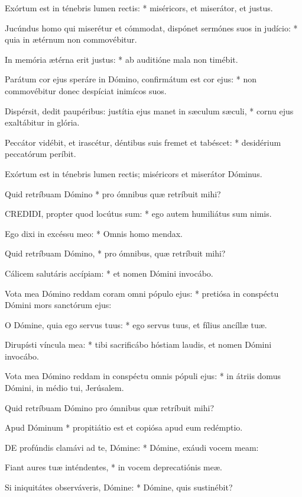 Exórtum est in ténebris lumen rectis: * miséricors, et miserátor, et justus.

Jucúndus homo qui miserétur et cómmodat, dispónet sermónes suos in judício: * quia in ætérnum non commovébitur.

In memória ætérna erit justus: * ab auditióne mala non timébit.

Parátum cor ejus speráre in Dómino, confirmátum est cor ejus: * non commovébitur donec despíciat inimícos suos.

Dispérsit, dedit paupéribus: justítia ejus manet in sæculum sæculi, * cornu ejus exaltábitur in glória.

Peccátor vidébit, et irascétur, déntibus suis fremet et tabéscet: * desidérium peccatórum períbit.

 Exórtum est in ténebris lumen rectis; miséricors et miserátor Dóminus.

 Quid retríbuam Dómino * pro ómnibus quæ retríbuit mihi?


\lettrine[lines=2]{C}{REDIDI}, propter quod locútus sum: * ego autem humiliátus sum nimis.

Ego dixi in excéssu meo: * Omnis homo mendax.

Quid retríbuam Dómino, * pro ómnibus, quæ retríbuit mihi?

Cálicem salutáris accípiam: * et nomen Dómini invocábo.

Vota mea Dómino reddam coram omni pópulo ejus: * pretiósa in conspéctu Dómini mors sanctórum ejus:

O Dómine, quia ego servus tuus: * ego servus tuus, et fílius ancíllæ tuæ.

Dirupísti víncula mea: * tibi sacrificábo hóstiam laudis, et nomen Dómini invocábo.

Vota mea Dómino reddam in conspéctu omnis pópuli ejus: * in átriis domus Dómini, in médio tui, Jerúsalem.

 Quid retríbuam Dómino pro ómnibus quæ retríbuit mihi?

 Apud Dóminum * propitiátio est et copiósa apud eum redémptio.


\lettrine[lines=2]{D}{E} profúndis clamávi ad te, Dómine: * Dómine, exáudi vocem meam:

Fiant aures tuæ inténdentes, * in vocem deprecatiónis meæ.

Si iniquitátes observáveris, Dómine: * Dómine, quis sustinébit?

